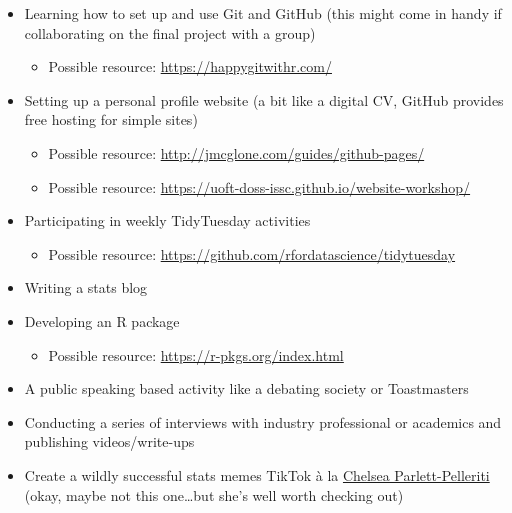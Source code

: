 \documentclass[
  openany]{book}
\providecommand{\tightlist}{%
  \setlength{\itemsep}{0pt}\setlength{\parskip}{0pt}}
\begin{document}
\begin{itemize}
\item
  Learning how to set up and use Git and GitHub (this might come in handy if collaborating on the final project with a group)

  \begin{itemize}
  \tightlist
  \item
    Possible resource: \url{https://happygitwithr.com/}
  \end{itemize}
\item
  Setting up a personal profile website (a bit like a digital CV, GitHub provides free hosting for simple sites)

  \begin{itemize}
  \tightlist
  \item
    Possible resource: \url{http://jmcglone.com/guides/github-pages/}
  \item
    Possible resource: \url{https://uoft-doss-issc.github.io/website-workshop/}
  \end{itemize}
\item
  Participating in weekly TidyTuesday activities

  \begin{itemize}
  \tightlist
  \item
    Possible resource: \url{https://github.com/rfordatascience/tidytuesday}
  \end{itemize}
\item
  Writing a stats blog
\item
  Developing an R package

  \begin{itemize}
  \tightlist
  \item
    Possible resource: \url{https://r-pkgs.org/index.html}
  \end{itemize}
\item
  A public speaking based activity like a debating society or Toastmasters
\item
  Conducting a series of interviews with industry professional or academics and publishing videos/write-ups
\item
  Create a wildly successful stats memes TikTok à la \href{https://www.tiktok.com/@chelseaparlettpelleriti/video/6811647290709757189?u_code=d894729j1bcal8\&preview_pb=0\&language=en\&timestamp=1585960235\&user_id=6736543492652696582\&utm_campaign=client_share\&app=musically\&utm_medium=ios\&user_id=6736543492652696582\&tt_from=twitter\&utm_source=twitter\&source=h5_m}{Chelsea Parlett-Pelleriti} (okay, maybe not this one\ldots but she's well worth checking out)
\end{itemize}
\end{document}
